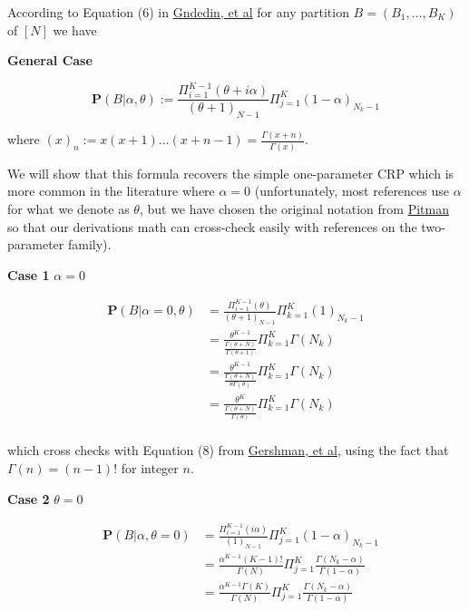 \documentclass[12pt]{article}
\begin{document}
According to Equation (6) in
\href{http://arxiv.org/pdf/0909.3642.pdf}{Gndedin, et al}
for any partition $B=(B_1,\dots,B_K)$ of $[N]$ we have

\textbf{General Case}

\begin{equation}
\mathbf{P}(B|\alpha,\theta)
:= \frac{\Pi_{i=1}^{K-1}(\theta+i\alpha)}{(\theta+1)_{N-1}}\Pi_{j=1}^K(1-\alpha)_{N_k-1}
\label{eq:crp-density}
\end{equation}

where $(x)_n := x(x+1)\dots(x+n-1) = \frac{\Gamma(x+n)}{\Gamma(x)}$.

We will show that this formula recovers the simple one-parameter CRP which is more
common in the literature where $\alpha = 0$ (unfortunately, most references use
$\alpha$ for what we denote as $\theta$, but we have chosen the original notation from
\href{http://link.springer.com/article/10.1007/BF01213386}{Pitman} so that our
derivations math can cross-check easily with references on the two-parameter family).

\textbf{Case 1} $\alpha = 0$

\begin{align*}
\mathbf{P}(B|\alpha=0,\theta)
    & = \frac{\Pi_{i=1}^{K-1}(\theta)}{(\theta+1)_{N-1}}\Pi_{k=1}^K(1)_{N_k-1}\\
   & = \frac{\theta^{K-1}}{\frac{\Gamma(\theta+N)}{\Gamma(\theta+1)}}\Pi_{k=1}^K\Gamma(N_k)\\
   & = \frac{\theta^{K-1}}{\frac{\Gamma(\theta+N)}{\theta\Gamma(\theta)}}\Pi_{k=1}^K\Gamma(N_k)\\
   & = \frac{\theta^{K}}{\frac{\Gamma(\theta+N)}{\Gamma(\theta)}}\Pi_{k=1}^K\Gamma(N_k)\\
\end{align*}

which cross checks with Equation (8) from
\href{http://web.mit.edu/sjgershm/www/GershmanBlei12.pdf#page=4}{Gershman, et al},
using the fact that $\Gamma(n) = (n-1)!$ for integer $n$.

\textbf{Case 2} $\theta = 0$

\begin{eqnarray*}
&\mathbf{P}(B|\alpha,\theta=0)
    & = \frac{\Pi_{i=1}^{K-1}(i\alpha)}{(1)_{N-1}}\Pi_{j=1}^K(1-\alpha)_{N_k-1}\\
&   & = \frac{\alpha^{K-1}(K-1)!}{\Gamma(N)}\Pi_{j=1}^K
            \frac{\Gamma(N_k-\alpha)}{\Gamma(1-\alpha)}\\
&   & = \frac{\alpha^{K-1}\Gamma(K)}{\Gamma(N)}\Pi_{j=1}^K
\frac{\Gamma(N_k-\alpha)}{\Gamma(1-\alpha)}
\end{eqnarray*}
\end{document}
